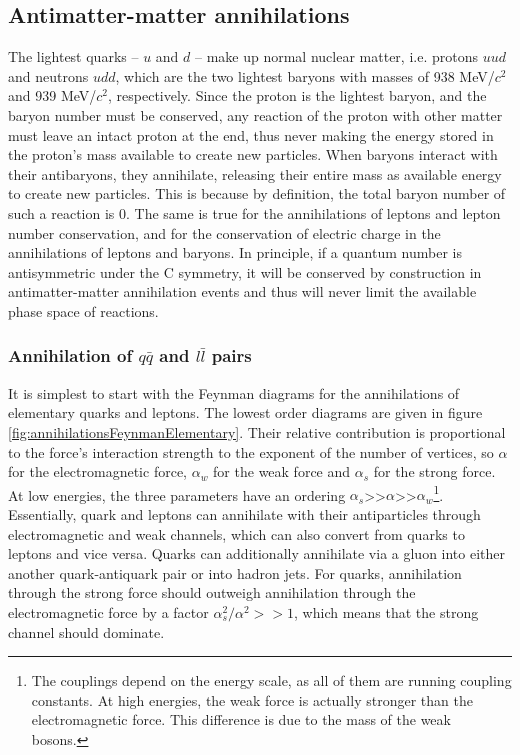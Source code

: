 \subsection{Antimatter-matter annihilations}
The lightest quarks -- $u$ and $d$ -- make up normal nuclear matter, i.e. protons $uud$ and neutrons $udd$, which are the two lightest baryons with masses of 938 MeV/$c^2$ and 939 MeV/$c^2$, respectively. Since the proton is the lightest baryon, and the baryon number must be conserved, any reaction of the proton with other matter must leave an intact proton at the end, thus never making the energy stored in the proton's mass available to create new particles. When baryons interact with their antibaryons, they annihilate, releasing their entire mass as available energy to create new particles. This is because by definition, the total baryon number of such a reaction is 0. The same is true for the annihilations of leptons and lepton number conservation, and for the conservation of electric charge in the annihilations of leptons and baryons. In principle, if a quantum number is antisymmetric under the C symmetry, it will be conserved by construction in antimatter-matter annihilation events and thus will never limit the available phase space of reactions. \\

\subsubsection{Annihilation of $q\bar{q}$ and $l\bar{l}$ pairs}

It is simplest to start with the Feynman diagrams for the annihilations of elementary quarks and leptons. The lowest order diagrams are given in figure \ref{fig:annihilationsFeynmanElementary}. Their relative contribution is proportional to the force's interaction strength to the exponent of the number of vertices, so $\alpha$ for the electromagnetic force, $\alpha_w$ for the weak force and $\alpha_s$ for the strong force. At low energies, the three parameters have an ordering $\alpha_s$>>$\alpha$>>$\alpha_w$\footnote{The couplings depend on the energy scale, as all of them are running coupling constants. At high energies, the weak force is actually stronger than the electromagnetic force. This difference is due to the mass of the weak bosons.}. Essentially, quark and leptons can annihilate with their antiparticles through electromagnetic and weak channels, which can also convert from quarks to leptons and vice versa. Quarks can additionally annihilate via a gluon into either another quark-antiquark pair or into hadron jets. For quarks, annihilation through the strong force should outweigh annihilation through the electromagnetic force by a factor $\alpha_s^2/\alpha^2 >>1$, which means that the strong channel should dominate. 

